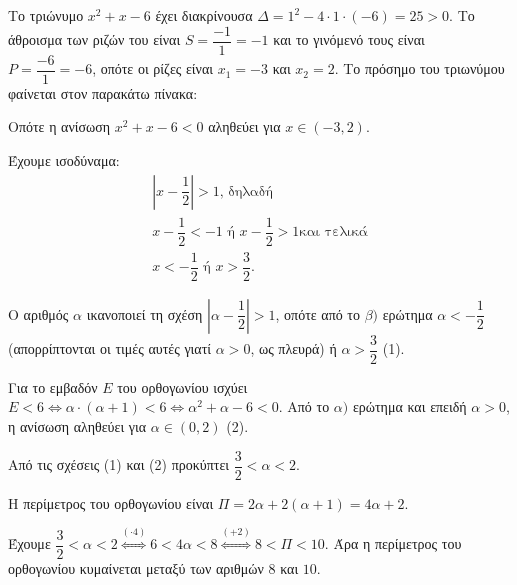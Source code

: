 
\begin{alist}
\item Το τριώνυμο $x^2 + x - 6$ έχει διακρίνουσα $\Delta = 1^2 - 4 \cdot 1 \cdot (-6) = 25 > 0$. Το άθροισμα των
ριζών του είναι $S = \dfrac{-1}{1} = -1$ και το γινόμενό τους είναι $P = \dfrac{-6}{1} = -6$, οπότε οι ρίζες είναι
$x_1 = -3$ και $x_2 = 2$. Το πρόσημο του τριωνύμου φαίνεται στον παρακάτω πίνακα:

\begin{center}
\end{center}

Οπότε η ανίσωση $x^2 + x - 6 < 0$ αληθεύει για $x \in (-3, 2)$.

\item Έχουμε ισοδύναμα:
\begin{gather*}
\left|x - \dfrac{1}{2}\right| > 1\text{, δηλαδή} \\
x - \dfrac{1}{2} < -1 \text{ ή } x - \dfrac{1}{2} > 1\text{και τελικά} \\
x < -\dfrac{1}{2} \text{ ή } x > \dfrac{3}{2}.
\end{gather*}

\item 
\begin{rlist}
\item Ο αριθμός $\alpha$ ικανοποιεί τη σχέση $\left|\alpha - \dfrac{1}{2}\right| > 1$, οπότε από το $\beta)$ ερώτημα $\alpha < -\dfrac{1}{2}$
(απορρίπτονται οι τιμές αυτές γιατί $\alpha > 0$, ως πλευρά) ή $\alpha > \dfrac{3}{2}$ (1).

Για το εμβαδόν $E$ του ορθογωνίου ισχύει $E < 6 \Leftrightarrow \alpha \cdot (\alpha + 1) < 6 \Leftrightarrow \alpha^2 + \alpha - 6 < 0$. Από
το $\alpha)$ ερώτημα και επειδή $\alpha > 0$, η ανίσωση αληθεύει για $\alpha \in (0, 2)$ (2).

Από τις σχέσεις (1) και (2) προκύπτει $\dfrac{3}{2} < \alpha < 2$.

\item Η περίμετρος του ορθογωνίου είναι $\Pi = 2\alpha + 2(\alpha + 1) = 4\alpha + 2$.

Έχουμε $\dfrac{3}{2} < \alpha < 2 \stackrel{(\cdot 4)}{\Leftrightarrow} 6 < 4\alpha < 8 \stackrel{(+2)}{\Leftrightarrow} 8 < \Pi < 10$. Άρα η περίμετρος του ορθογωνίου
κυμαίνεται μεταξύ των αριθμών $8$ και $10$.
\end{rlist}
\end{alist}

